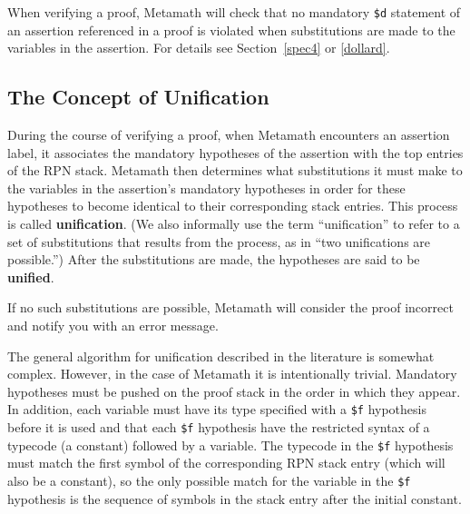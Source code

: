 When verifying a proof, Metamath will check that no mandatory
\texttt{\$d} statement of an assertion referenced in a proof is violated
when substitutions are made to the variables in the assertion.  For details
see Section~\ref{spec4} or \ref{dollard}.

\subsection{The Concept of Unification} \label{unify}

During the course of verifying a proof, when Metamath
encounters an assertion label, it associates the
mandatory hypotheses of the assertion with the top
entries of the RPN stack.  Metamath then
determines what substitutions it must make to the variables in the assertion's mandatory
hypotheses in order for these hypotheses to become identical to their
corresponding stack entries.  This process is called {\bf
unification}.  (We also informally use the term
``unification'' to refer to a set of substitutions that results from the
process, as in ``two unifications are possible.'')  After the substitutions
are made, the hypotheses are said to be {\bf unified}.

If no such substitutions are possible, Metamath will consider the proof
incorrect and notify you with an error message.

The general algorithm for unification described in the literature is
somewhat complex.
However, in the case of Metamath it is intentionally trivial.
Mandatory hypotheses must be
pushed on the proof stack in the order in which they appear.
In addition, each variable must have its type specified
with a \texttt{\$f} hypothesis before it is used
and that each \texttt{\$f} hypothesis
have the restricted syntax of a typecode (a constant) followed by a variable.
The typecode in the \texttt{\$f} hypothesis must match the first symbol of
the corresponding RPN stack entry (which will also be a constant), so
the only possible match for the variable in the \texttt{\$f} hypothesis is
the sequence of symbols in the stack entry after the initial constant.

